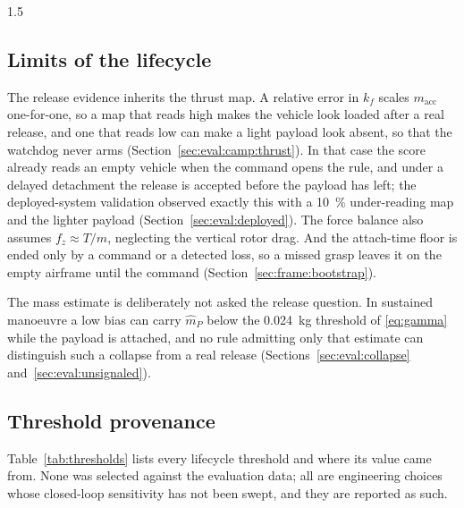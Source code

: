 \begin{spacing}{1.5}
\subsection{Limits of the lifecycle}\label{sec:frame:limits-lifecycle}

The release evidence inherits the thrust map. A relative error in $k_f$ scales
$m_{\mathrm{acc}}$ one-for-one, so a map that reads high makes the vehicle look
loaded after a real release, and one that reads low can make a light payload look
absent, so that the watchdog never arms (Section~\ref{sec:eval:camp:thrust}). In
that case the score already reads an empty vehicle when the command opens the
rule, and under a delayed detachment the release is accepted before the payload
has left; the deployed-system validation observed exactly this with a
\SI{10}{\percent} under-reading map and the lighter payload
(Section~\ref{sec:eval:deployed}). The
force balance also assumes $f_z\approx T/m$, neglecting the vertical rotor drag.
And the attach-time floor is ended only by a command or a detected loss, so a
missed grasp leaves it on the empty airframe until the command
(Section~\ref{sec:frame:bootstrap}).

The mass estimate is deliberately not asked the release question. In sustained
manoeuvre a low bias can carry $\hat m_P$ below the \SI{0.024}{\kg} threshold of
\eqref{eq:gamma} while the payload is attached, and no rule admitting only that
estimate can distinguish such a collapse from a real release
(Sections~\ref{sec:eval:collapse} and~\ref{sec:eval:unsignaled}).

\subsection{Threshold provenance}\label{sec:frame:thresholds}

Table~\ref{tab:thresholds} lists every lifecycle threshold and where its value
came from. None was selected against the evaluation data; all are engineering
choices whose closed-loop sensitivity has not been swept, and they are reported
as such.


\end{spacing}
